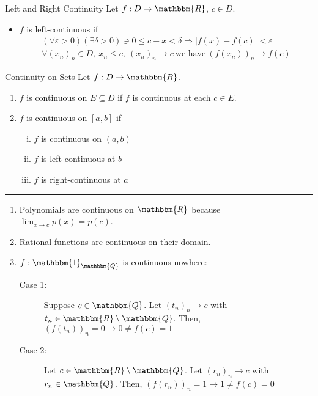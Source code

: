 \documentclass[10pt]{extarticle}
\newcommand{\Q}{\mathbbm{Q}}
\newcommand{\R}{\mathbbm{R}}
\begin{document}
  \begin{problem}{Left and Right Continuity}
    Let $f: D\rightarrow \R$, $c\in D$.
    \begin{itemize}
      \item $f$ is left-continuous if
        \begin{align*}
          (\forall \varepsilon > 0)(\exists \delta > 0) \ni 0\leq c-x < \delta \Rightarrow |f(x) - f(c)| < \varepsilon\\
          \forall (x_n)_n \in D,~x_n \leq c,~(x_n)_n \rightarrow c~\text{we have}~\left(f(x_n)\right)_n \rightarrow f(c)
        \end{align*}
    \end{itemize}
  \end{problem}
  \begin{problem}{Continuity on Sets}
    Let $f: D\rightarrow \R$.
    \begin{enumerate}[(1)]
      \item $f$ is continuous on $E\subseteq D$ if $f$ is continuous at each $c\in E$.
      \item $f$ is continuous on $[a,b]$ if
        \begin{enumerate}[(i)]
          \item $f$ is continuous on $(a,b)$
          \item $f$ is left-continuous at $b$
          \item $f$ is right-continuous at $a$
        \end{enumerate}
    \end{enumerate}
    \vspace{4pt}
    \rule{\textwidth}{0.4pt}
    \vspace{4pt}
    \begin{enumerate}[(1)]
      \item Polynomials are continuous on $\R$ because $\lim_{x\rightarrow c}p(x) = p(c)$.
      \item Rational functions are continuous on their domain.
      \item $f: \mathbbm{1}_{\Q}$ is continuous nowhere:\\
        \begin{description}
          \item[Case 1:] Suppose $c \in \Q$. Let $(t_n)_n \rightarrow c$ with $t_n \in \R\setminus \Q$. Then, $(f(t_n))_n = 0 \rightarrow 0 \neq f(c) = 1$
          \item[Case 2:] Let $c\in \R \setminus \Q$. Let $(r_n)_n \rightarrow c$ with $r_n \in \Q$. Then, $(f(r_n))_n = 1 \rightarrow 1 \neq f(c) = 0$
        \end{description}
    \end{enumerate}
  \end{problem}
\end{document}
